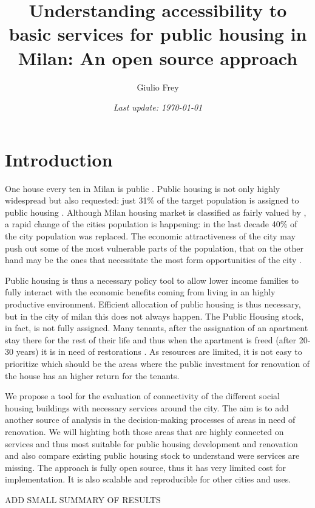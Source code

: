 \documentclass[11pt, titlepage]{article}
\author{Giulio Frey}
\title{Understanding accessibility to basic services for public housing in Milan: An open source approach}
\date{\textit{Last update: \today}}
\begin{document}
		\maketitle


\section{Introduction}


One house every ten in Milan is public  . Public housing is not only highly widespread but also requested:  just 31\% of the target population is assigned to public housing \parencite{comune2023}. Although Milan housing market is classified as fairly valued by \cite{ubsbubble}, a rapid change of the cities population is happening: in the last decade 40\% of the city population was replaced. The economic attractiveness of the city may push out some of the most vulnerable parts of the population, that on the other hand may be the ones that necessitate the most form opportunities of the city \parencite{Chetty2017}.

Public housing is thus a necessary policy tool to allow lower income families to fully interact with the economic benefits coming from living in an highly productive environment. Efficient allocation of public housing is thus necessary, but in the city of milan this does not always happen. The Public Housing stock, in fact, is not fully assigned. Many tenants, after the assignation of an apartment stay there for the rest of their life and thus when the apartment is freed (after 20-30 years) it is in need of restorations \parencite{maran2023}. As resources are limited, it is not easy to prioritize which should be the areas where the public investment for renovation of the house has an higher return for the tenants.

We propose a tool for the evaluation of connectivity of the different social housing buildings with necessary services around the city. The aim is to add another source of analysis in the decision-making processes of areas  in need of renovation. We will highting both those areas that are highly connected on services and thus most suitable for public housing development and renovation and also compare existing public housing stock to understand were services are missing.  The approach is fully open source, thus it has very limited cost for implementation. It is also scalable and reproducible for other cities and uses.

ADD SMALL SUMMARY OF RESULTS 
\end{document}
